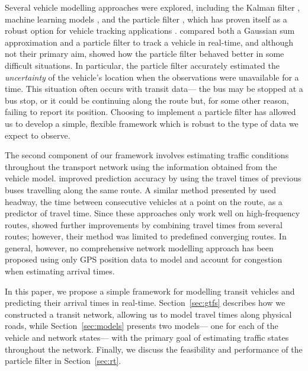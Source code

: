 Several vehicle modelling approaches were explored,
including the Kalman filter \citep{Dailey_2001,Cathey_2003},
machine learning models \citep{Yu_2006,Chang_2010},
and the particle filter \citep{Hans_2015},
which has proven itself as a robust option for
\rt vehicle tracking applications
\citep{Gustafsson_2002,Davidson_2011}.
\cite{Ulmke_2006} compared both a Gaussian sum approximation and a particle filter
to track a vehicle in real-time,
and although not their primary aim,
showed how the particle filter behaved better in some difficult situations.
In particular, the particle filter accurately estimated the \emph{uncertainty}
of the vehicle's location when the observations were unavailable for a time.
This situation often occurs with transit data---%
the bus may be stopped at a bus stop, or it could be continuing along the route but,
for some other reason, failing to report its position.
Choosing to implement a particle filter has allowed us
to develop a simple, flexible framework
which is robust to the type of data we expect to observe.


The second component of our framework
involves estimating traffic conditions throughout the transport network
using the information obtained from the vehicle model.
\cite{Yu_2010} improved prediction accuracy by using the travel times
of previous buses travelling along the same route.
A similar method presented by \cite{Hans_2015}
used headway, the time between consecutive vehicles at a point on the route,
as a predictor of travel time.
Since these approaches only work well on high-frequency routes,
\cite{Yu_2011} showed further improvements by combining travel times
from several routes;
however, their method was limited to predefined converging routes.
In general, however, no comprehensive network modelling approach has been proposed using
only GPS position data to model and account for congestion when estimating arrival times.

In this paper, we propose a simple framework for modelling transit vehicles and predicting
their arrival times in real-time.
Section~\ref{sec:gtfs} describes how we constructed a transit network,
allowing us to model travel times along physical roads,
while Section~\ref{sec:models} presents two \rt models---%
one for each of the vehicle and network states---%
with the primary goal of estimating \rt traffic states throughout the network.
Finally, we discuss the \rt feasibility and performance
of the particle filter in Section~\ref{sec:rt}.
